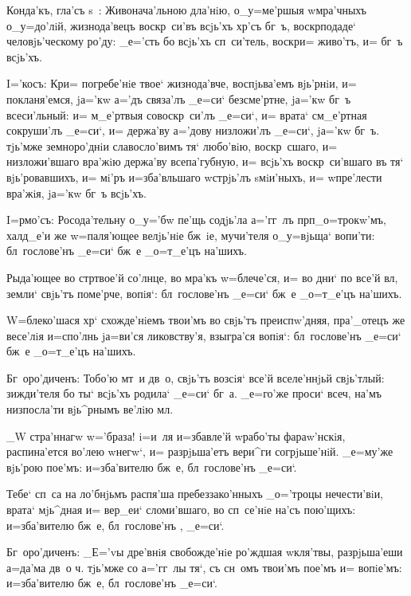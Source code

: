 Конда'къ, гла'съ s~: Живонача'льною дла'нiю, 
о_у=ме'ршыя w\т мра'чныхъ о_у=до'лiй, жизнода'вецъ 
воскр~си'въ всjь'хъ хр'съ бг~ъ, воскр подаде` 
человjь'ческому ро'ду: _е='сть бо всjь'хъ сп~си'тель, 
воскр и= живо'тъ, и= бг~ъ всjь'хъ.

I='косъ: Кр и= погребе'нiе твое` жизнода'вче, 
воспjьва'емъ вjь'рнiи, и= покланя'емся, jа='кw а='дъ 
связа'лъ _е=си` безсме'ртне, jа='кw бг~ъ всеси'льный: и= 
м_е'ртвыя совоскр~си'лъ _е=си`, и= врата` см_е'ртная 
сокруши'лъ _е=си`, и= держа'ву а='дову низложи'лъ _е=си`, 
jа='кw бг~ъ. тjь'мже земноро'днiи славосло'вимъ тя` 
любо'вiю, воскр~сшаго, и= низложи'вшаго вра'жiю держа'ву 
всепа'губную, и= всjь'хъ воскр~си'вшаго въ тя` 
вjь'ровавшихъ, и= мi'ръ и=зба'вльшаго w\т стрjь'лъ 
sмiи'ныхъ, и= w\т пре'лести вра'жiя, jа='кw бг~ъ всjь'хъ.


I=рмо'съ: Росода'тельну о_у='бw пе'щь содjь'ла 
а='гг~лъ прп _о=трокw'мъ, халд_е'и же w=паля'ющее 
велjь'нiе бж~iе, мучи'теля о_у=вjьща` вопи'ти: 
бл~гослове'нъ _е=си` бж~е _о=т_е'цъ на'шихъ.

Рыда'ющее во стр твое'й со'лнце, во мра'къ 
w=блече'ся, и= во дни` по все'й вл, земли` свjь'тъ 
поме'рче, вопiя`: бл~гослове'нъ _е=си` бж~е _о=т_е'цъ 
на'шихъ.

W=блеко'шася хр` схожде'нiемъ твои'мъ во свjь'тъ 
преиспw'дняя, пра'_отецъ же весе'лiя и=спо'лнь jа=ви'ся 
ликовству'я, взыгра'ся вопiя`: бл~гослове'нъ _е=си` бж~е 
_о=т_е'цъ на'шихъ.

Бг~оро'диченъ: Тобо'ю мт~и дв~о, свjь'тъ возсiя` все'й 
вселе'ннjьй свjь'тлый: зижди'теля бо ты` всjь'хъ родила` 
_е=си` бг~а. _е=го'же проси` всеч, на'мъ низпосла'ти 
вjь^рнымъ ве'лiю мл. 


_W стра'ннагw w='браза! i=и~ля и=збавле'й w\т рабо'ты 
фараw'нскiя, распина'ется во'лею w\т негw`, и= 
разрjьша'етъ вери^ги согрjьше'нiй. _е=му'же вjь'рою 
пое'мъ: и=зба'вителю бж~е, бл~гослове'нъ _е=си`.

Тебе` сп~са на ло'бнjьмъ распя'ша пребеззако'нныхъ 
_о='троцы нечести'вiи, врата` мjь^дная и= вер_еи` 
сломи'вшаго, во сп~се'нiе на'съ пою'щихъ: и=зба'вителю 
бж~е, бл~гослове'нъ , _е=си`.

Бг~оро'диченъ: _Е='vы дре'внiя свобожде'нiе ро'ждшая 
w\т кля'твы, разрjьша'еши а=да'ма дв~о ч. тjь'мже со 
а='гг~лы тя`, съ сн~омъ твои'мъ пое'мъ и= вопiе'мъ: 
и=зба'вителю бж~е, бл~гослове'нъ _е=си`.

